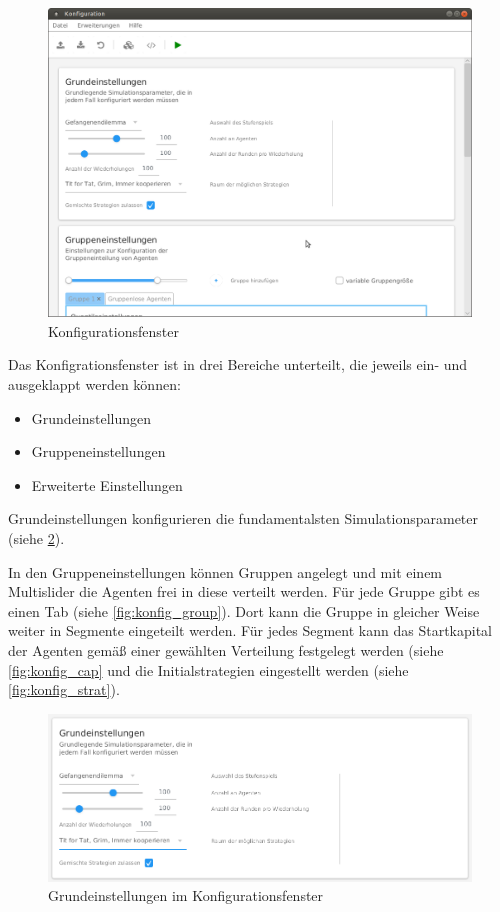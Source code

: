 \documentclass[parskip=full,11pt]{scrartcl}
\begin{document}
\begin{figure}[ht]
	\centering
	\includegraphics[width=\textwidth]{images/konfig.png}
	\caption{\label{fig:konfig}
		Konfigurationsfenster}
\end{figure} 

Das Konfigrationsfenster ist in drei Bereiche unterteilt, die jeweils ein- und ausgeklappt werden können:
\begin{itemize} \itemsep -10pt
	\item Grundeinstellungen
	\item Gruppeneinstellungen
	\item Erweiterte Einstellungen
\end{itemize}

Grundeinstellungen konfigurieren die fundamentalsten Simulationsparameter (siehe \cref{fig:konfig_main}).

In den Gruppeneinstellungen können Gruppen angelegt und mit einem Multislider die Agenten frei in diese verteilt werden. Für jede Gruppe gibt es einen Tab (siehe \cref{fig:konfig_group}). Dort kann die Gruppe in gleicher Weise weiter in Segmente eingeteilt werden. Für jedes Segment kann das Startkapital der Agenten gemäß einer gewählten Verteilung festgelegt werden (siehe \cref{fig:konfig_cap} und die Initialstrategien eingestellt werden (siehe \cref{fig:konfig_strat}).

\begin{figure}[ht]
	\centering
	\includegraphics[width=\textwidth]{images/konfig_main.png}
	\caption{\label{fig:konfig_main}
		Grundeinstellungen im Konfigurationsfenster}
\end{figure}
\end{document}
